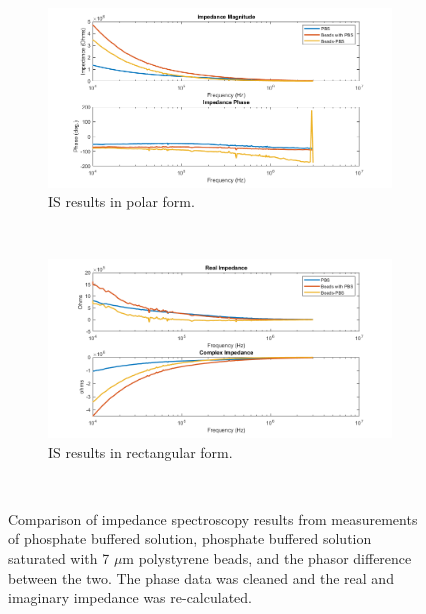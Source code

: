 \begin{figure}[h]
    \centering
    \begin{subfigure}[b]{\textwidth}
        \centering
        \includegraphics[width=\textwidth]{images/correctedPolar.png}
        \caption{IS results in polar form.}
    \end{subfigure}
    \\
    \vspace{0.1 in}
    \begin{subfigure}[b]{\textwidth}
        \centering
        \includegraphics[width=\textwidth]{images/correctedRectangular.png}
        \caption{IS results in rectangular form.}
        \label{fig:clean_IS_data_beads_PBS_DI_comp}
    \end{subfigure}
    \\
    \vspace{0.1 in}
    \caption[PBS, PBS saturated with micro-beads, and the phasor difference.]{Comparison of impedance spectroscopy results from measurements of phosphate buffered solution, phosphate buffered solution saturated with 7 $\mu$m polystyrene beads, and the phasor difference between the two. The phase data was cleaned and the real and imaginary impedance was re-calculated.}
    \label{fig:IS_data_pbs_pbsBeads_difference}
\end{figure}

